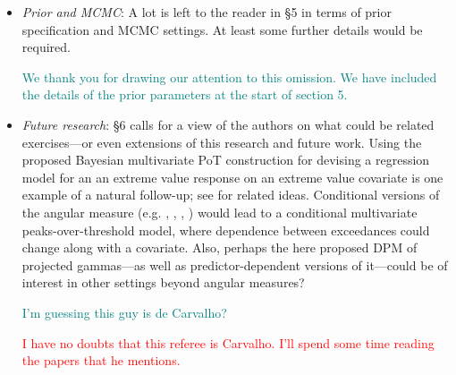 \documentclass[10pt]{article}
\newcommand{\comment}[1]{\textcolor{teal}{#1}}
\newcommand{\bruno}[1]{\textcolor{red}{#1}}
\begin{document}
\begin{itemize}
\item \emph{Prior and MCMC}: A lot is left to the reader in §5 in terms of
    prior specification and MCMC settings.  At least some further details would 
    be required.

    \comment{We thank you for drawing our attention to this omission.  We have included the
    details of the prior parameters at the start of section 5.}

    

\item \emph{Future research}: §6 calls for a view of the authors on what 
    could be related exercises—or even extensions of this research and future 
    work. Using the proposed Bayesian multivariate PoT construction for 
    devising a regression model for an an extreme value response on an extreme 
    value covariate is one example of a natural follow-up; see 
    \cite{carvalho2022} for related ideas. Conditional versions of the angular 
    measure (e.g. \cite{carvalho2016}, \cite{castro2018}, \cite{escobar2018}, 
    \cite{mhalla2019}) would lead to a conditional multivariate 
    peaks-over-threshold model, where dependence between exceedances could 
    change along with a covariate. Also, perhaps the here proposed DPM of 
    projected gammas—as well as predictor-dependent versions of it—could be of 
    interest in other settings beyond angular measures?

    \comment{I'm guessing this guy is de Carvalho?}
    
    \bruno{I have no doubts that this referee is Carvalho. I'll spend some time 
    reading the papers that he mentions.}
    
\end{itemize}
\end{document}
